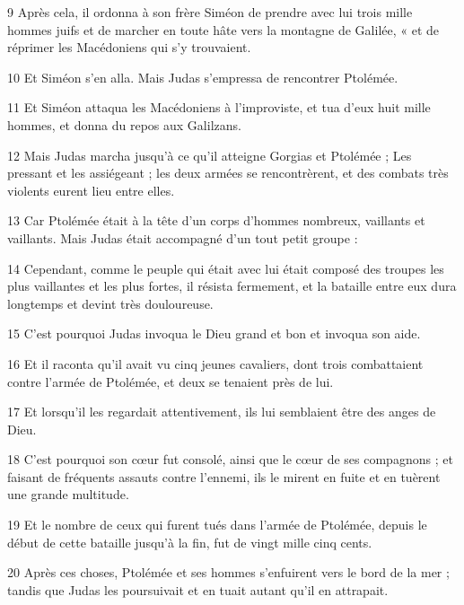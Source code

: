 \par 9 Après cela, il ordonna à son frère Siméon de prendre avec lui trois mille hommes juifs et de marcher en toute hâte vers la montagne de Galilée, « et de réprimer les Macédoniens qui s'y trouvaient.

\par 10 Et Siméon s'en alla. Mais Judas s'empressa de rencontrer Ptolémée.

\par 11 Et Siméon attaqua les Macédoniens à l'improviste, et tua d'eux huit mille hommes, et donna du repos aux Galilzans.

\par 12 Mais Judas marcha jusqu'à ce qu'il atteigne Gorgias et Ptolémée ; Les pressant et les assiégeant ; les deux armées se rencontrèrent, et des combats très violents eurent lieu entre elles.

\par 13 Car Ptolémée était à la tête d'un corps d'hommes nombreux, vaillants et vaillants. Mais Judas était accompagné d'un tout petit groupe :

\par 14 Cependant, comme le peuple qui était avec lui était composé des troupes les plus vaillantes et les plus fortes, il résista fermement, et la bataille entre eux dura longtemps et devint très douloureuse.

\par 15 C'est pourquoi Judas invoqua le Dieu grand et bon et invoqua son aide.

\par 16 Et il raconta qu'il avait vu cinq jeunes cavaliers, dont trois combattaient contre l'armée de Ptolémée, et deux se tenaient près de lui.

\par 17 Et lorsqu'il les regardait attentivement, ils lui semblaient être des anges de Dieu.

\par 18 C'est pourquoi son cœur fut consolé, ainsi que le cœur de ses compagnons ; et faisant de fréquents assauts contre l'ennemi, ils le mirent en fuite et en tuèrent une grande multitude.

\par 19 Et le nombre de ceux qui furent tués dans l'armée de Ptolémée, depuis le début de cette bataille jusqu'à la fin, fut de vingt mille cinq cents.

\par 20 Après ces choses, Ptolémée et ses hommes s'enfuirent vers le bord de la mer ; tandis que Judas les poursuivait et en tuait autant qu'il en attrapait.

